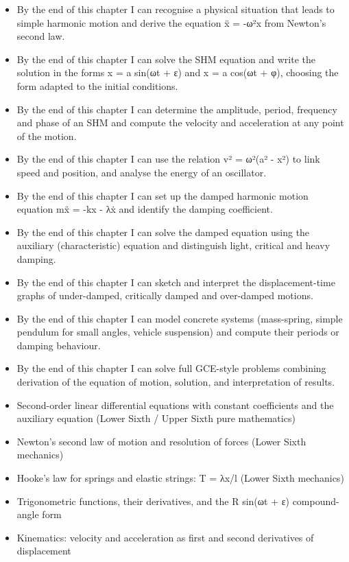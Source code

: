 \documentclass[11pt]{article}
\begin{document}
\begin{objectifs}
\begin{itemize}
\item By the end of this chapter I can recognise a physical situation that leads to simple harmonic motion and derive the equation ẍ = -ω²x from Newton's second law.
\item By the end of this chapter I can solve the SHM equation and write the solution in the forms x = a sin(ωt + ε) and x = a cos(ωt + φ), choosing the form adapted to the initial conditions.
\item By the end of this chapter I can determine the amplitude, period, frequency and phase of an SHM and compute the velocity and acceleration at any point of the motion.
\item By the end of this chapter I can use the relation v² = ω²(a² - x²) to link speed and position, and analyse the energy of an oscillator.
\item By the end of this chapter I can set up the damped harmonic motion equation mẍ = -kx - λẋ and identify the damping coefficient.
\item By the end of this chapter I can solve the damped equation using the auxiliary (characteristic) equation and distinguish light, critical and heavy damping.
\item By the end of this chapter I can sketch and interpret the displacement-time graphs of under-damped, critically damped and over-damped motions.
\item By the end of this chapter I can model concrete systems (mass-spring, simple pendulum for small angles, vehicle suspension) and compute their periods or damping behaviour.
\item By the end of this chapter I can solve full GCE-style problems combining derivation of the equation of motion, solution, and interpretation of results.
\end{itemize}
\end{objectifs}

\begin{prerequis}
\begin{itemize}
\item Second-order linear differential equations with constant coefficients and the auxiliary equation (Lower Sixth / Upper Sixth pure mathematics)
\item Newton's second law of motion and resolution of forces (Lower Sixth mechanics)
\item Hooke's law for springs and elastic strings: T = λx/l (Lower Sixth mechanics)
\item Trigonometric functions, their derivatives, and the R sin(ωt + ε) compound-angle form
\item Kinematics: velocity and acceleration as first and second derivatives of displacement
\end{itemize}
\end{prerequis}
\end{document}
